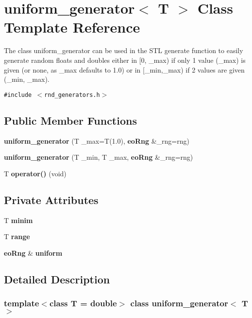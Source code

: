 \section{uniform\_\-generator$<$ T $>$ Class Template Reference}
\label{classuniform__generator}
The class uniform\_\-generator can be used in the STL generate function to easily generate random floats and doubles either in [0, \_\-max) if only 1 value (\_\-max) is given (or none, as \_\-max defaults to 1.0) or in [\_\-min,\_\-max) if 2 values are given (\_\-min, \_\-max).  


{\tt \#include $<$rnd\_\-generators.h$>$}

\subsection*{Public Member Functions}
\begin{CompactItemize}
\item 
{\bf uniform\_\-generator} (T \_\-max=T(1.0), {\bf eo\-Rng} \&\_\-rng=rng)\label{classuniform__generator_a0}

\item 
{\bf uniform\_\-generator} (T \_\-min, T \_\-max, {\bf eo\-Rng} \&\_\-rng=rng)\label{classuniform__generator_a1}

\item 
T {\bf operator()} (void)\label{classuniform__generator_a2}

\end{CompactItemize}
\subsection*{Private Attributes}
\begin{CompactItemize}
\item 
T {\bf minim}\label{classuniform__generator_r0}

\item 
T {\bf range}\label{classuniform__generator_r1}

\item 
{\bf eo\-Rng} \& {\bf uniform}\label{classuniform__generator_r2}

\end{CompactItemize}


\subsection{Detailed Description}
\subsubsection*{template$<$class T = double$>$ class uniform\_\-generator$<$ T $>$}

